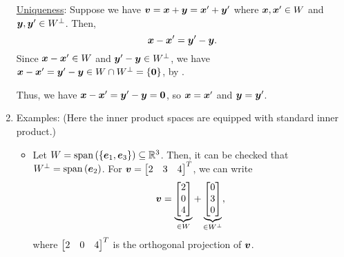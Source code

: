 \begin{enumerate}
\underline{Uniqueness}: Suppose we have
\(\vb*{v}=\vb*{x}+\vb*{y}=\vb*{x}'+\vb*{y}'\) where
\(\vb*{x},\vb*{x}'\in W\) and \(\vb*{y},\vb*{y}'\in W^{\perp}\). Then,
\[
\vb*{x}-\vb*{x}'=\vb*{y}'-\vb*{y}.
\]
Since \(\vb*{x}-\vb*{x}'\in W\) and \(\vb*{y}'-\vb*{y}\in W^{\perp}\), we
have \(\vb*{x}-\vb*{x}'=\vb*{y}'-\vb*{y}\in W\cap W^{\perp}=\{\vb*{0}\}\),
by .

Thus, we have \(\vb*{x}-\vb*{x}'=\vb*{y}'-\vb*{y}=\vb*{0}\), so
\(\vb*{x}=\vb*{x}'\) and \(\vb*{y}=\vb*{y}'\).

\item Examples: (Here the inner product spaces are equipped with standard inner
product.)
\begin{itemize}
\item Let \(W=\operatorname{span}\qty(\{\vb*{e}_1,\vb*{e}_3\})\subseteq \mathbb{R}^3\). Then, it can be
checked that \(W^{\perp}=\operatorname{span}\qty(\vb*{e}_2)\). For \(\vect{v}=\mqty[2&3&4]^{T}\),
we can write
\[
\vect{v}=\underbrace{\mqty[2\\ 0\\ 4]}_{\in W}+\underbrace{\mqty[0\\ 3\\ 0]}_{\in W^{\perp}},
\]
where \(\mqty[2&0&4]^{T}\) is the orthogonal projection of \(\vb*{v}\).


\end{itemize}
\end{enumerate}

